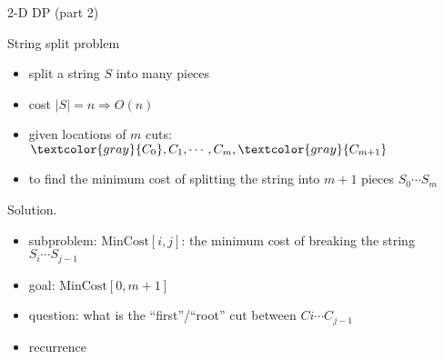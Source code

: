 \begin{frame}{2-D DP (part 2)}
  \begin{exampleblock}{String split problem }
    \begin{itemize}
      \item split a string $S$ into many pieces
      \item cost $|S| = n \Rightarrow O(n)$
      \item given locations of $m$ cuts: $\textcolor{gray}{C_{0}}, C_{1}, \cdots, C_{m}, \textcolor{gray}{C_{m+1}}$
      \item to find the minimum cost of splitting the string into $m+1$ pieces
	$S_{0} \cdots S_{m}$
    \end{itemize}
  \end{exampleblock}

  \begin{block}{Solution.}
    \begin{itemize}
      \item subproblem: $\text{MinCost}[i,j]$: the minimum cost of breaking the string $S_{i} \cdots S_{j-1}$
      \item goal: $\text{MinCost}[0,m+1]$
      \item question: what is the ``first''/``root'' cut between $C{i} \cdots C_{j-1}$
      \item recurrence
    \end{itemize}
  \end{block}
\end{frame}
